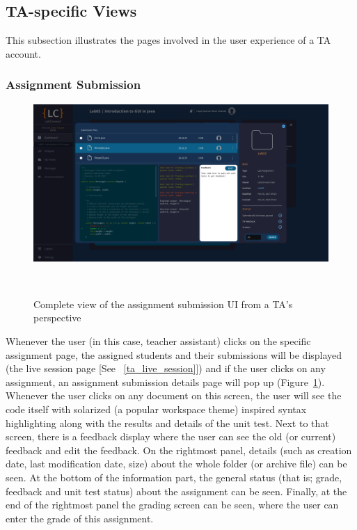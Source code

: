 \documentclass[a4paper, 12pt]{article}
\begin{document}
    \pagebreak


    \subsection{TA-specific Views}

    This subsection illustrates the pages involved in the user experience of a TA account.

    \subsubsection{Assignment Submission}

    \begin{figure}[H]
        \centering
        \includegraphics[width=\textwidth]{ta_assignment_submission}
        \caption{Complete view of the assignment submission UI from a TA's perspective}~\label{fig:ta_assignment_submission_full}
    \end{figure}

    Whenever the user (in this case, teacher assistant) clicks on the specific assignment page, the assigned students and their submissions will be displayed
    (the live session page [See ~\ref{ta_live_session}]) and if the user clicks on any assignment,
    an assignment submission details page will pop up (Figure~\ref{fig:ta_assignment_submission_full}). Whenever the user clicks on any document on this screen, the user will see the code itself with
    solarized (a popular workspace theme) inspired syntax highlighting along with the results and details of the unit test. Next to that screen, there is a feedback display where the user can see the old
    (or current) feedback and edit the feedback. On the rightmost panel, details (such as creation date, last modification date, size) about the whole folder
    (or archive file) can be seen. At the bottom of the information part, the general status (that is; grade, feedback and unit test status) about the assignment can be seen.
    Finally, at the end of the rightmost panel the grading screen can be seen, where the user can enter the grade of this assignment.
\end{document}

